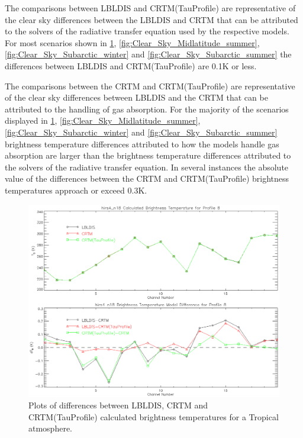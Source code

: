 The comparisons between LBLDIS and CRTM(TauProfile) are representative of the clear sky differences between the LBLDIS and CRTM that can be attributed to the solvers of the radiative transfer equation used by the respective models. For most scenarios shown in \ref{fig:Clear_Sky_Tropical}, \ref{fig:Clear_Sky_Midlatitude_summer}, \ref{fig:Clear_Sky_Subarctic_winter} and \ref{fig:Clear_Sky_Subarctic_summer} the differences between LBLDIS and CRTM(TauProfile) are 0.1K or less. 

The comparisons between the CRTM and CRTM(TauProfile) are representative of the clear sky differences between LBLDIS and the CRTM that can be attributed to the handling of gas absorption. For the majority of the scenarios displayed in \ref{fig:Clear_Sky_Tropical}, \ref{fig:Clear_Sky_Midlatitude_summer}, \ref{fig:Clear_Sky_Subarctic_winter} and \ref{fig:Clear_Sky_Subarctic_summer} brightness temperature differences attributed to how the models handle gas absorption are larger than the brightness temperature differences attributed to the solvers of the radiative transfer equation. In several instances the absolute value of the differences between the CRTM and CRTM(TauProfile) brightness temperatures approach or exceed 0.3K.

\begin{figure}[htp]
  \centering{}
  \includegraphics[scale=0.8]{./graphics/Clear_Sky_Comparison_08.eps}
  \caption{Plots of differences between LBLDIS, CRTM and CRTM(TauProfile) calculated brightness temperatures for
   a Tropical atmosphere.}
  \label{fig:Clear_Sky_Tropical}
\end{figure}

